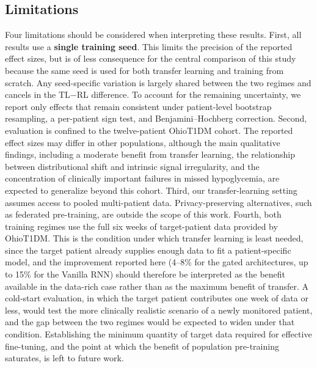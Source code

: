 \documentclass[conference]{IEEEtran}
\begin{document}
\subsection{Limitations}
\label{sec:limitations}
Four limitations should be considered when interpreting these results. First, all results use a \textbf{single training seed}. This limits the precision of the reported effect sizes, but is of less consequence for the central comparison of this study because the same seed is used for both transfer learning and training from scratch. Any seed-specific variation is largely shared between the two regimes and cancels in the TL$-$RL difference. To account for the remaining uncertainty, we report only effects that remain consistent under patient-level bootstrap resampling, a per-patient sign test, and Benjamini--Hochberg correction.
Second, evaluation is confined to the twelve-patient OhioT1DM cohort.
The reported effect sizes may differ in other populations, although the main qualitative findings, including a moderate benefit from transfer learning, the relationship between distributional shift and intrinsic signal irregularity, and the concentration of clinically important failures in missed hypoglycemia, are expected to generalize beyond this cohort. Third, our transfer-learning setting assumes access to pooled multi-patient data. Privacy-preserving alternatives, such as federated pre-training, are outside the scope of this work. Fourth, both training regimes use the full six weeks of target-patient data
provided by OhioT1DM. This is the condition under which transfer learning is
least needed, since the target patient already supplies enough data to fit a
patient-specific model, and the improvement reported here (4--8\% for the gated
architectures, up to 15\% for the Vanilla RNN) should therefore be interpreted as
the benefit available in the data-rich case rather than as the maximum benefit of
transfer. A cold-start evaluation, in which the
target patient contributes one week of data or less, would test the more
clinically realistic scenario of a newly monitored patient, and the gap between
the two regimes would be expected to widen under that condition. Establishing the
minimum quantity of target data required for effective fine-tuning, and the point
at which the benefit of population pre-training saturates, is left to future work.


\end{document}
